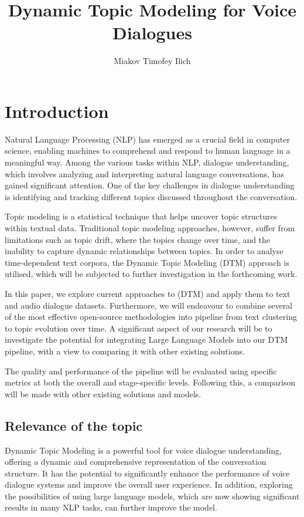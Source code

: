 \documentclass[PMI,VKR]{HSEUniversity}
\title{Dynamic Topic Modeling for Voice Dialogues}
\author{Miakov Timofey Ilich}
\begin{document}
\maketitle

\chapter*{Introduction}

Natural Language Processing (NLP) has emerged as a crucial field in computer science, enabling machines to comprehend and respond to human language in a meaningful way. 
Among the various tasks within NLP, dialogue understanding, which involves analyzing and interpreting natural language conversations, has gained significant attention. 
One of the key challenges in dialogue understanding is identifying and tracking different topics discussed throughout the conversation.

Topic modeling is a statistical technique that helps uncover topic structures within textual data. 
Traditional topic modeling approaches, however, suffer from limitations such as topic drift, where the topics change over time, and the inability to capture dynamic relationships between topics. 
In order to analyse time-dependent text corpora, the Dynamic Topic Modeling (DTM) approach is utilised, which will be subjected to further investigation in the forthcoming work.

In this paper, we explore current approaches to (DTM) and apply them to text and audio dialogue datasets. 
Furthermore, we will endeavour to combine several of the most effective open-source methodologies into pipeline from text clustering to topic evolution over time. 
A significant aspect of our research will be to investigate the potential for integrating Large Language Models into our DTM pipeline, with a view to comparing it with other existing solutions.

The quality and performance of the pipeline will be evaluated using specific metrics at both the overall and stage-specific levels. Following this, a comparison will be made with other existing solutions and models.


\section{Relevance of the topic}

Dynamic Topic Modeling is a powerful tool for voice dialogue understanding, offering a dynamic and comprehensive representation of the conversation structure. 
It has the potential to significantly enhance the performance of voice dialogue systems and improve the overall user experience.
In addition, exploring the possibilities of using large language models, which are now showing significant results in many NLP tasks, can further improve the model.
\end{document}
